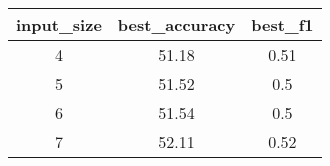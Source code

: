 \begin{tabular}{ccc}
	input\_size & best\_accuracy & best\_f1 \\\hline\hline
	4           & 51.18          & 0.51     \\
	5           & 51.52          & 0.5      \\
	6           & 51.54          & 0.5      \\
	7           & 52.11          & 0.52     \\
\end{tabular}